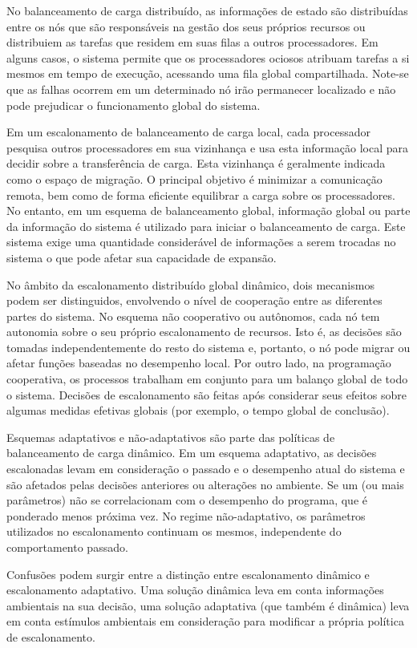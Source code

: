 No balanceamento de carga distribuído, as informações de estado são distribuídas entre os nós que são responsáveis na gestão dos seus próprios recursos ou distribuiem as tarefas que residem em suas filas a outros processadores. Em alguns casos, o sistema permite que os processadores ociosos atribuam tarefas a si mesmos em tempo de execução, acessando uma fila global compartilhada. Note-se que as falhas ocorrem em um determinado nó irão permanecer localizado e não pode prejudicar o funcionamento global do sistema. 

Em um escalonamento de balanceamento de carga local, cada processador pesquisa outros processadores em sua vizinhança e usa esta informação local para decidir sobre a transferência de carga. Esta vizinhança é geralmente indicada como o espaço de migração. O principal objetivo é minimizar a comunicação remota, bem como de forma eficiente equilibrar a carga sobre os processadores. No entanto, em um esquema de balanceamento global, informação global ou  parte da informação do sistema é utilizado para iniciar o balanceamento de carga. Este sistema exige uma quantidade considerável de informações a serem trocadas no sistema o que pode afetar sua capacidade de expansão.

No âmbito da escalonamento distribuído global dinâmico, dois mecanismos podem ser distinguidos, envolvendo o nível de cooperação entre as diferentes partes do sistema. No esquema não cooperativo ou autônomos, cada nó tem autonomia sobre o seu próprio escalonamento de recursos. Isto é, as decisões são tomadas independentemente do resto do sistema e, portanto, o nó pode migrar ou afetar funções baseadas no desempenho local. Por outro lado, na programação cooperativa, os processos trabalham em conjunto para um balanço global de todo o sistema. Decisões de escalonamento são feitas após considerar seus efeitos sobre algumas medidas efetivas globais (por exemplo, o tempo global de conclusão).

Esquemas adaptativos e não-adaptativos são parte das políticas de balanceamento de carga dinâmico. Em um esquema adaptativo, as decisões escalonadas levam em consideração o passado e o desempenho atual do sistema e são afetados pelas decisões anteriores ou alterações no ambiente. Se um (ou mais parâmetros) não se correlacionam com o desempenho do programa, que é ponderado menos próxima vez. No regime não-adaptativo, os parâmetros utilizados no escalonamento continuam os mesmos, independente do comportamento passado. 
	
Confusões podem surgir entre a distinção entre escalonamento dinâmico e escalonamento adaptativo. Uma solução dinâmica leva em conta informações ambientais na sua decisão, uma solução adaptativa (que também é dinâmica) leva em conta estímulos ambientais em consideração para modificar a própria política de escalonamento.



